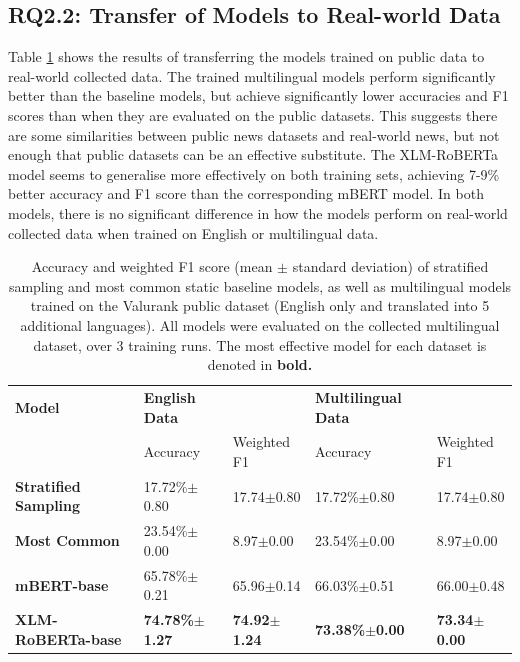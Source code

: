 \documentclass{l4proj}
\begin{document}
\subsection{RQ2.2: Transfer of Models to Real-world Data}  \hfill \par

Table \ref{table:transferability} shows the results of transferring the models trained on public data to real-world collected data. The trained multilingual models perform significantly better than the baseline models, but achieve significantly lower accuracies and F1 scores than when they are evaluated on the public datasets. This suggests there are some similarities between public news datasets and real-world news, but not enough that public datasets can be an effective substitute. The XLM-RoBERTa model seems to generalise more effectively on both training sets, achieving 7-9\% better accuracy and F1 score than the corresponding mBERT model. In both models, there is no significant difference in how the models perform on real-world collected data when trained on English or multilingual data.

\begin{table}[h]
\begin{tabular}{lllll}
\hline
\textbf{Model}               & \textbf{English Data} &             & \textbf{Multilingual Data} &             \\ \cline{2-5} 
                             & Accuracy              & Weighted F1 & Accuracy                   & Weighted F1 \\ \hline
\textbf{Stratified Sampling} & 17.72\%$\pm$0.80     & 17.74$\pm$0.80 & 17.72\%$\pm$0.80     & 17.74$\pm$0.80            \\
\textbf{Most Common}         & 23.54\%$\pm$0.00     & 8.97$\pm$0.00 & 23.54\%$\pm$0.00     & 8.97$\pm$0.00 \\ \hline
\textbf{mBERT-base}          & 65.78\%$\pm$0.21     & 65.96$\pm$0.14         & 66.03\%$\pm$0.51        & 66.00$\pm$0.48         \\
\textbf{XLM-RoBERTa-base}    & \textbf{74.78\%$\pm$1.27}  & \textbf{74.92$\pm$1.24}        & \textbf{73.38\%$\pm$0.00}   & \textbf{73.34$\pm$0.00}        \\ \hline
\end{tabular}
\caption{Accuracy and weighted F1 score (mean $\pm$ standard deviation) of stratified sampling and most common static baseline models, as well as multilingual models trained on the Valurank public dataset (English only and translated into 5 additional languages). All models were evaluated on the collected multilingual dataset, over 3 training runs. The most effective model for each dataset is denoted in \textbf{bold.}}
\label{table:transferability}
\end{table}
\end{document}
